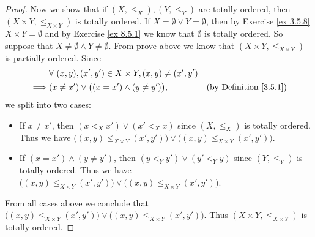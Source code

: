 \begin{proof}
    Now we show that if \((X, \leq_X), (Y, \leq_Y)\) are totally ordered, then \((X \times Y, \leq_{X \times Y})\) is totally ordered.
    If \(X = \emptyset \lor Y = \emptyset\), then by Exercise \ref{ex 3.5.8} \(X \times Y = \emptyset\) and by Exercise \ref{ex 8.5.1} we know that \(\emptyset\) is totally ordered.
    So suppose that \(X \neq \emptyset \land Y \neq \emptyset\).
    From prove above we know that \((X \times Y, \leq_{X \times Y})\) is partially ordered.
    Since
    \begin{align*}
                 & \forall\ (x, y), (x', y') \in X \times Y, (x, y) \neq (x', y')                                      \\
        \implies & (x \neq x') \lor \big((x = x') \land (y \neq y')\big),         & \text{(by Definition \ref{3.5.1})}
    \end{align*}
    we split into two cases:
    \begin{itemize}
        \item If \(x \neq x'\), then \((x <_X x') \lor (x' <_X x)\) since \((X, \leq_X)\) is totally ordered.
              Thus we have \(\big((x, y) \leq_{X \times Y} (x', y')\big) \lor \big((x, y) \leq_{X \times Y} (x', y')\big)\).
        \item If \((x = x') \land (y \neq y')\), then \((y <_Y y') \lor (y' <_Y y)\) since \((Y, \leq_Y)\) is totally ordered.
              Thus we have \(\big((x, y) \leq_{X \times Y} (x', y')\big) \lor \big((x, y) \leq_{X \times Y} (x', y')\big)\).
    \end{itemize}
    From all cases above we conclude that \(\big((x, y) \leq_{X \times Y} (x', y')\big) \lor \big((x, y) \leq_{X \times Y} (x', y')\big)\).
    Thus \((X \times Y, \leq_{X \times Y})\) is totally ordered.


\end{proof}
